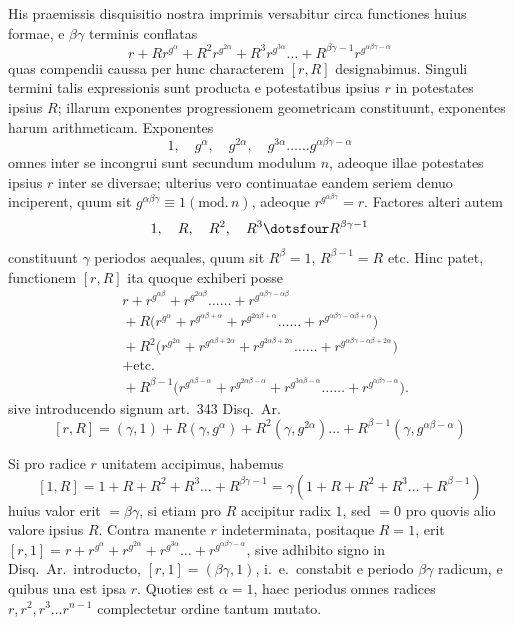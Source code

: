 His praemissis disquisitio nostra imprimis versabitur circa functiones huius formae, e $\beta\gamma$ terminis conflatas
\[
r+Rr^{g^\alpha}+R^2r^{g^{2\alpha}}+R^3r^{g^{3\alpha}}\ldots+R^{\beta\gamma-1}r^{g^{\alpha\beta\gamma-\alpha}}
\]
quas compendii caussa per hunc characterem $[r,R]$ designabimus. Singuli termini talis expressionis sunt producta e potestatibus ipsius $r$ in potestates ipsius $R$; illarum exponentes progressionem geometricam constituunt, exponentes harum arithmeticam. Exponentes
\[
1,\quad g^\alpha,\quad g^{2\alpha},\quad g^{3\alpha}\ldots\ldots g^{\alpha\beta\gamma-\alpha}
\]
omnes inter se incongrui sunt secundum modulum $n$, adeoque illae potestates ipsius $r$ inter se diversae; ulterius vero continuatae eandem seriem denuo inciperent, quum sit $g^{\alpha\beta\gamma}\equiv1(\mathrm{mod.}\,n)$, adeoque $r^{g^{\alpha\beta\gamma}}=r$. Factores alteri autem
\[
1,\quad R,\quad R^2,\quad R^3\dotsfour R^{\beta\gamma-1}
\]
constituunt $\gamma$ periodos aequales, quum sit $R^\beta=1$, $R^{\beta-1}=R$ etc. Hinc patet, functionem $[r,R]$ ita quoque exhiberi posse
\[
\begin{aligned}
&r+r^{g^{\alpha\beta}}+r^{g^{2\alpha\beta}}\ldots\ldots+r^{g^{\alpha\beta\gamma-\alpha\beta}}\\
&{}+R\bigl(r^{g^\alpha}+r^{g^{\alpha\beta+\alpha}}+r^{g^{2\alpha\beta+\alpha}}\ldots\ldots+r^{g^{\alpha\beta\gamma-\alpha\beta+\alpha}}\bigr)\\
&{}+R^2\bigl(r^{g^{2\alpha}}+r^{g^{\alpha\beta+2\alpha}}+r^{g^{2\alpha\beta+2\alpha}}\ldots\ldots+r^{g^{\alpha\beta\gamma-\alpha\beta+2\alpha}}\bigr)\\
&{}+\text{etc.}\\
&{}+R^{\beta-1}\bigl(r^{g^{\alpha\beta-\alpha}}+r^{g^{2\alpha\beta-\alpha}}+r^{g^{3\alpha\beta-\alpha}}\ldots\ldots+r^{g^{\alpha\beta\gamma-\alpha}}\bigr).
\end{aligned}
\]
sive introducendo signum art.\ 343 Disq.\ Ar.
\[
[r,R]=(\gamma,1)+R(\gamma,g^\alpha)+R^2(\gamma,g^{2\alpha})\ldots+R^{\beta-1}(\gamma,g^{\alpha\beta-\alpha})
\]

Si pro radice $r$ unitatem accipimus, habemus
\[
[1,R]=1+R+R^2+R^3\ldots+R^{\beta\gamma-1}=\gamma(1+R+R^2+R^3\ldots+R^{\beta-1})
\]
huius valor erit $=\beta\gamma$, si etiam pro $R$ accipitur radix $1$, sed $=0$ pro quovis alio valore ipsius $R$. Contra manente $r$ indeterminata, positaque $R=1$, erit $[r,1]=r+r^{g^\alpha}+r^{g^{2\alpha}}+r^{g^{3\alpha}}\ldots+r^{g^{\alpha\beta\gamma-\alpha}}$, sive adhibito signo in Disq.\ Ar.\ introducto, $[r,1]=(\beta\gamma,1)$, i.\ e.\ constabit e periodo $\beta\gamma$ radicum, e quibus una est ipsa $r$. Quoties est $\alpha=1$, haec periodus omnes radices $r,r^2,r^3\ldots r^{n-1}$ complectetur ordine tantum mutato.

